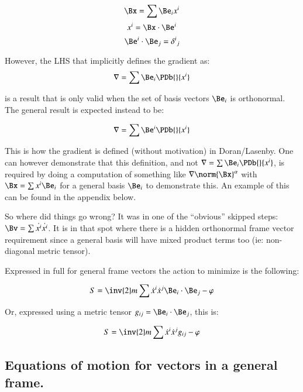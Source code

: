 \begin{equation*}
\Bx = \sum \Be_i x^i
\end{equation*}
\begin{equation*}
x^i = \Bx \cdot \Be^i
\end{equation*}
\begin{equation*}
\Be^i \cdot \Be_j = {\delta^i}_j
\end{equation*}

However, the LHS that implicitly defines the gradient as:
\begin{equation*}
\grad = \sum \Be_i \PDb{}{x^i}
\end{equation*}

is a result that is only valid when the set of basis vectors $\Be_i$ is orthonormal.  The general result is
expected instead to be:

\begin{equation*}
\grad = \sum \Be^i \PDb{}{x^i}
\end{equation*}

This is how the gradient is defined (without motivation) in Doran/Lasenby.  One can however demonstrate that this definition, and not $\grad = \sum \Be_i \PDb{}{x^i}$, is required by doing a computation of something like $\grad \norm{\Bx}^\alpha$ with $\Bx = \sum x^i \Be_i$ for a general basis $\Be_i$ to demonstrate this.  An example of this can be found in the appendix below.

So where did things go wrong?  It was in one of the ``obvious'' skipped steps: $\Bv = \sum \dot{x^i} \dot{x^i}$.  It is in that
spot where there is a hidden orthonormal frame vector requirement since a general basis will have mixed product terms too
(ie: non-diagonal metric tensor).

Expressed in full for general frame vectors the action to minimize is the following:

\begin{equation}
S = \inv{2} m \sum \dot{x}^i \dot{x}^j \Be_i \cdot \Be_j -\varphi
\end{equation}

Or, expressed using a metric tensor $g_{ij} = \Be_i \cdot \Be_j$, this is:

\begin{equation}
S = \inv{2} m \sum \dot{x}^i \dot{x}^j g_{ij} -\varphi
\end{equation}

\subsection{Equations of motion for vectors in a general frame. }

